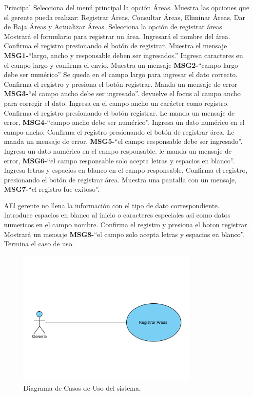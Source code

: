 	\begin{UCtrayectoria}{Principal}
		\UCpaso[\UCactor] Selecciona del menú principal la opción Áreas.
		\UCpaso Muestra las opciones que el gerente pueda realizar: Registrar Áreas, Consultar Áreas, Eliminar Áreas, Dar de Baja Áreas y Actualizar Áreas.
		\UCpaso[\UCactor] Selecciona la opción de registrar áreas.
		\UCpaso Mostrará el formulario para registrar un área.		
		\UCpaso[\UCactor] Ingresará el nombre del área.
		\UCpaso[\UCactor] Confirma el registro presionando el botón de registrar.
		\UCpaso Muestra el mensaje {\bf MSG1-}``largo, ancho y responsable deben ser ingresados.'' 	
		\UCpaso[\UCactor] Ingresa caracteres en el campo largo y confirma el envio.
		\UCpaso Muestra un mensaje {\bf MSG2-}``campo largo debe ser numérico''
		\UCpaso Se queda en el campo largo para ingresar el dato correcto.
		\UCpaso[\UCactor] Confirma el registro y presiona el botón registrar.
		\UCpaso Manda un mensaje de error {\bf MSG3-}``el campo ancho debe ser ingresado''.
		\UCpaso devuelve el focus al campo ancho para corregir el dato.
		\UCpaso[\UCactor] Ingresa en el campo ancho un carácter como registro.
		\UCpaso[\UCactor] Confirma el registro presionando el botón registrar.
		\UCpaso Le manda un mensaje de error, {\bf MSG4-}``campo ancho debe ser numérico''.
		\UCpaso[\UCactor] Ingresa un dato numérico en el campo ancho.
		\UCpaso[\UCactor] Confirma el registro presionando el botón  de registrar área.
		\UCpaso Le manda un mensaje de error, {\bf MSG5-}``el campo responsable debe ser ingresado''.
		\UCpaso[\UCactor] Ingresa un dato numérico en el campo responsable.
		\UCpaso le manda un mensaje de error, {\bf MSG6-}``el campo responsable solo acepta letras y espacios en blanco''. 
		\UCpaso[\UCactor] Ingresa letras y espacios en blanco en el campo responsable.
		\UCpaso[\UCactor] Confirma el registro, presionando el botón de registrar área.
		\UCpaso Muestra una pantalla con un mensaje, {\bf MSG7-}``el registro fue exitoso''.
	\end{UCtrayectoria}
		
		\begin{UCtrayectoriaA}{A}{El gerente no llena la información con el tipo de dato correspondiente.}
			\UCpaso[\UCactor] Introduce espacios en blanco al inicio o caracteres especiales asi como datos numericos en el campo nombre.
			\UCpaso[\UCactor] Confirma el registro y presiona el boton registrar.
			\UCpaso Mostrará un mensaje  {\bf MSG8-}``el campo solo acepta letras y espacios en blanco''.
			\UCpaso[] Termina el caso de uso.
		\end{UCtrayectoriaA}

\begin{figure}[htbp!]
		\centering
			\includegraphics[width=0.8\textwidth]{images/ResgistraArea}
		\caption{Diagrama de Casos de Uso del sistema.}
	\end{figure}
